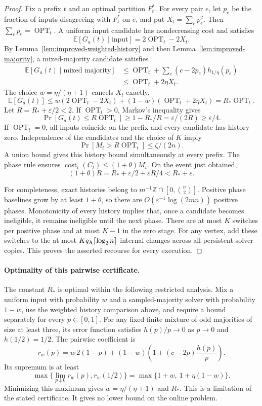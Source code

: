 \documentclass[11pt]{article}
\begin{document}
\begin{proof}
Fix a prefix $t$ and an optimal partition $F_t^*$. For every pair $e$,
let $p_e$ be the fraction of inputs disagreeing with $F_t^*$ on $e$, and
put $X_t=\sum_e p_e^2$. Then $\sum_e p_e=\operatorname{OPT}_t$.
A uniform input candidate has nondecreasing cost and satisfies
\[
 \mathbb E[G_a(t)\mid\text{input}]
 =2\operatorname{OPT}_t-2X_t.
\]
By Lemma~\ref{lem:improved-weighted-history} and then
Lemma~\ref{lem:improved-majority}, a mixed-majority candidate satisfies
\begin{align*}
 \mathbb E[G_a(t)\mid\text{mixed majority}]
 &\le\operatorname{OPT}_t+\sum_e(c-2p_e)h_{1/\eta}(p_e)\\
 &\le\operatorname{OPT}_t+2\eta X_t.
\end{align*}
The choice $w=\eta/(\eta+1)$ cancels $X_t$ exactly,
\[
 \mathbb E[G_a(t)]
 \le w(2\operatorname{OPT}_t-2X_t)
 +(1-w)(\operatorname{OPT}_t+2\eta X_t)
 =R_*\operatorname{OPT}_t.
\]
Let $R=R_*+\varepsilon/2<2$. If $\operatorname{OPT}_t>0$,
Markov's inequality gives
\[
 \Pr[G_a(t)\le R\operatorname{OPT}_t]
 \ge1-R_*/R=\varepsilon/(2R)\ge\varepsilon/4.
\]
If $\operatorname{OPT}_t=0$, all inputs coincide on the prefix and every
candidate has history zero. Independence of the candidates and the choice
of $K$ imply
\[
 \Pr[M_t>R\operatorname{OPT}_t]\le\zeta/(2n).
\]
A union bound gives this history bound simultaneously at every prefix.
The phase rule ensures
$\operatorname{cost}_t(C_t)\le(1+\theta)M_t$. On the event just obtained,
\[
 (1+\theta)R=R_*+\varepsilon/2+\varepsilon R/4
 <R_*+\varepsilon.
\]

For completeness, exact histories belong to
$m^{-1}\mathbb Z\cap[0,\binom n2]$. Positive phase baselines grow by at
least $1+\theta$, so there are $O(\varepsilon^{-1}\log(2mn))$
positive phases. Monotonicity of every history implies that, once a candidate becomes
ineligible, it remains ineligible until the next phase.
There are at most $K$ switches per positive phase and at most $K-1$ in
the zero stage. For any vertex, add these switches to the at most
$Kq_{\rm A}\lceil\log_2 n\rceil$ internal changes across all persistent
solver copies. This proves the asserted recourse for every execution.
\end{proof}

\paragraph{Optimality of this pairwise certificate.}
The constant $R_*$ is optimal within the following restricted analysis.
Mix a uniform input with probability $w$ and a sampled-majority solver
with probability $1-w$, use the weighted history comparison above, and
require a bound separately for every $p\in[0,1]$. For any fixed finite
mixture of odd majorities of size at least three, its error function
satisfies $h(p)/p\to0$ as $p\to0$ and $h(1/2)=1/2$.
The pairwise coefficient is
\[
 r_w(p)=w\,2(1-p)
       +(1-w)\left(1+(c-2p)\frac{h(p)}p\right).
\]
Its supremum is at least
\[
 \max\{\lim_{p\downarrow0}r_w(p),r_w(1/2)\}
 =\max\{1+w,\ 1+\eta(1-w)\}.
\]
Minimizing this maximum gives $w=\eta/(\eta+1)$ and $R_*$. This is a
limitation of the stated certificate. It gives no lower bound on the
online problem.
\end{document}
